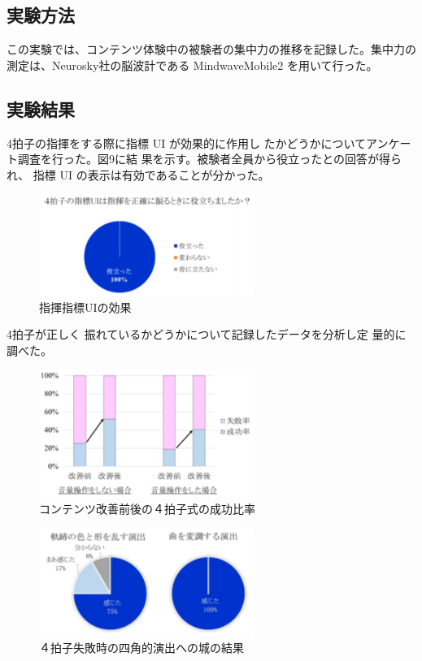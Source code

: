 \documentclass[uplatex]{jsarticle}   %
\begin{document}
\subsection{実験方法}
この実験では、コンテンツ体験中の被験者の集中力の推移を記録した。集中力の測定は、Neurosky社の脳波計である MindwaveMobile2 を用いて行った。


\subsection{実験結果}
4拍子の指揮をする際に指標 UI が効果的に作用し たかどうかについてアンケート調査を行った。図9に結 果を示す。被験者全員から役立ったとの回答が得られ、 指標 UI の表示は有効であることが分かった。 
\begin{figure}[H]
 \centering
 \includegraphics[clip,width=7cm]{UIkouka.png}
 \caption{指揮指標UIの効果}\label{fig:hoge}
\end{figure}

4拍子が正しく 振れているかどうかについて記録したデータを分析し定 量的に調べた。

\begin{figure}[H]
 \centering
 \includegraphics[clip,width=7cm]{sippairitu.png}
 \caption{コンテンツ改善前後の４拍子式の成功比率}\label{fig:hoge}
\end{figure}

\begin{figure}[H]
 \centering
 \includegraphics[clip,width=7cm]{miss.png}
 \caption{４拍子失敗時の四角的演出への城の結果}\label{fig:hoge}
\end{figure}




\end{document}
